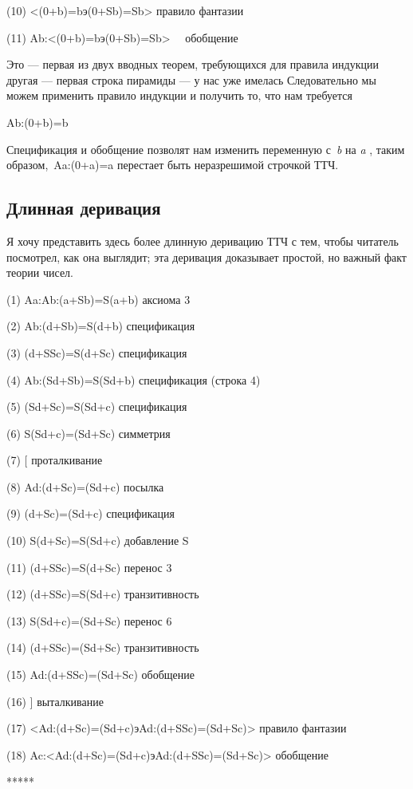 \documentclass[../main.tex]{subfiles}
\begin{document}
(10) \textless(0+b)=bэ(0+Sb)=Sb\textgreater{} правило фантазии

(11) Ab:\textless(0+b)=bэ(0+Sb)=Sb\textgreater~~ обобщение

Это --- первая из двух вводных теорем, требующихся для правила индукции другая --- первая строка пирамиды --- у нас уже имелась Следовательно мы можем применить правило индукции и получить то, что нам требуется

Ab:(0+b)=b

Спецификация и обобщение позволят нам изменить переменную с~\emph{b} на \emph{a} , таким образом,~Aa:(0+a)=a перестает быть неразрешимой строчкой ТТЧ.


\subsection{Длинная деривация}

Я хочу представить здесь более длинную деривацию ТТЧ с тем, чтобы читатель посмотрел, как она выглядит; эта деривация доказывает простой, но важный факт теории чисел.

(1) Aa:Ab:(a+Sb)=S(a+b) аксиома 3

(2) Ab:(d+Sb)=S(d+b) спецификация

(3) (d+SSc)=S(d+Sc) спецификация

(4) Ab:(Sd+Sb)=S(Sd+b) спецификация (строка 4)

(5) (Sd+Sc)=S(Sd+c) спецификация

(6) S(Sd+c)=(Sd+Sc) симметрия

(7) {[} проталкивание

(8) Ad:(d+Sc)=(Sd+c) посылка

(9) (d+Sc)=(Sd+c) спецификация

(10) S(d+Sc)=S(Sd+c) добавление S

(11) (d+SSc)=S(d+Sc) перенос 3

(12) (d+SSc)=S(Sd+c) транзитивность

(13) S(Sd+c)=(Sd+Sc) перенос 6

(14) (d+SSc)=(Sd+Sc) транзитивность

(15) Ad:(d+SSc)=(Sd+Sc) обобщение

(16) {]} выталкивание

(17) \textless Ad:(d+Sc)=(Sd+c)эAd:(d+SSc)=(Sd+Sc)\textgreater{} правило фантазии

(18) Ac:\textless Ad:(d+Sc)=(Sd+c)эAd:(d+SSc)=(Sd+Sc)\textgreater{} обобщение

*****
\end{document}
